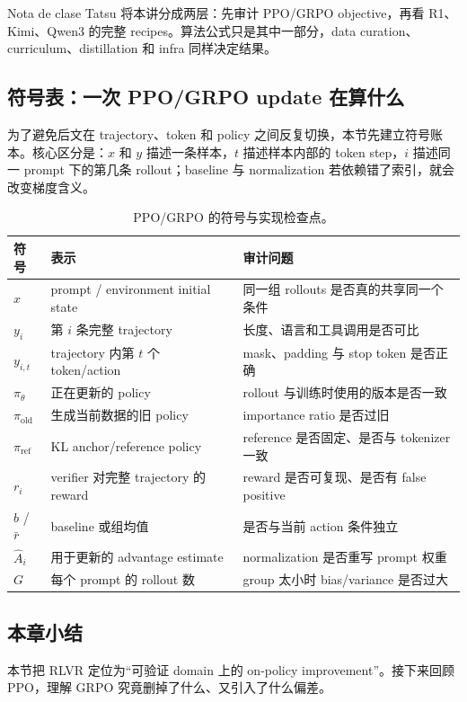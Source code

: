\begin{knowledgebox}{Nota de clase}
Tatsu 将本讲分成两层：先审计 PPO/GRPO objective，再看 R1、Kimi、Qwen3 的完整 recipes。算法公式只是其中一部分，data curation、curriculum、distillation 和 infra 同样决定结果。
\end{knowledgebox}

\subsection{符号表：一次 PPO/GRPO update 在算什么}

为了避免后文在 trajectory、token 和 policy 之间反复切换，本节先建立符号账本。核心区分是：$x$ 和 $y$ 描述一条样本，$t$ 描述样本内部的 token step，$i$ 描述同一 prompt 下的第几条 rollout；baseline 与 normalization 若依赖错了索引，就会改变梯度含义。

\begin{table}[H]
\centering
\begin{tabular}{L{0.14\textwidth}L{0.34\textwidth}L{0.42\textwidth}}
\toprule
符号 & 表示 & 审计问题 \\
\midrule
$x$ & prompt / environment initial state & 同一组 rollouts 是否真的共享同一个条件 \\
$y_i$ & 第 $i$ 条完整 trajectory & 长度、语言和工具调用是否可比 \\
$y_{i,t}$ & trajectory 内第 $t$ 个 token/action & mask、padding 与 stop token 是否正确 \\
$\pi_\theta$ & 正在更新的 policy & rollout 与训练时使用的版本是否一致 \\
$\pi_{\mathrm{old}}$ & 生成当前数据的旧 policy & importance ratio 是否过旧 \\
$\pi_{\mathrm{ref}}$ & KL anchor/reference policy & reference 是否固定、是否与 tokenizer 一致 \\
$r_i$ & verifier 对完整 trajectory 的 reward & reward 是否可复现、是否有 false positive \\
$b$ / $\bar r$ & baseline 或组均值 & 是否与当前 action 条件独立 \\
$\hat A_i$ & 用于更新的 advantage estimate & normalization 是否重写 prompt 权重 \\
$G$ & 每个 prompt 的 rollout 数 & group 太小时 bias/variance 是否过大 \\
\bottomrule
\end{tabular}
\caption{PPO/GRPO 的符号与实现检查点。}
\end{table}

\subsection{本章小结}

本节把 RLVR 定位为“可验证 domain 上的 on-policy improvement”。接下来回顾 PPO，理解 GRPO 究竟删掉了什么、又引入了什么偏差。

